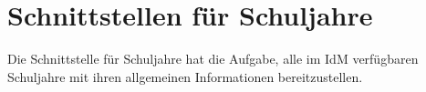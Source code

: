 \section{Schnittstellen für Schuljahre}
Die Schnittstelle für Schuljahre hat die Aufgabe, alle im IdM verfügbaren Schuljahre mit ihren allgemeinen Informationen bereitzustellen.


%

%
%